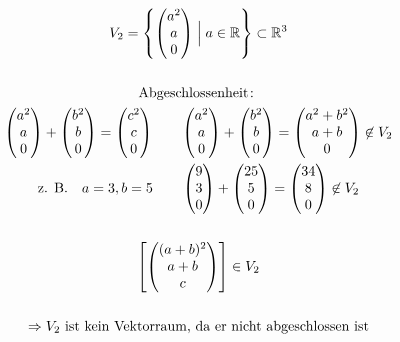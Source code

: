 \begin{gather*}
  V_2 = \left\{\begin{pmatrix}a^2 \\ a \\ 0\end{pmatrix} \Bigm| a \in \mathbb{R} \right\} \subset \mathbb{R}^3 \\\\
  \text{Abgeschlossenheit} \colon \\
  \begin{pmatrix}a^2 \\ a \\ 0\end{pmatrix} + \begin{pmatrix}b^2 \\ b \\ 0\end{pmatrix} = \begin{pmatrix}c^2 \\ c \\ 0\end{pmatrix} \qquad \begin{pmatrix}a^2 \\ a \\ 0\end{pmatrix} + \begin{pmatrix}b^2 \\ b \\ 0\end{pmatrix} = \begin{pmatrix}a^2 + b^2 \\ a + b \\ 0\end{pmatrix} \not\in V_2 \\
  \text{z. B.}\quad a = 3, b = 5 \qquad \begin{pmatrix}9 \\ 3 \\ 0\end{pmatrix} + \begin{pmatrix}25 \\ 5 \\ 0\end{pmatrix} = \begin{pmatrix}34 \\ 8 \\ 0\end{pmatrix} \not\in V_2 \\\\
  \left[\begin{pmatrix}(a + b)^2 \\ a + b \\ c\end{pmatrix}\right] \in V_2 \\\\
  \Rightarrow \text{$V_2$ ist kein Vektorraum, da er nicht abgeschlossen ist}
\end{gather*}
